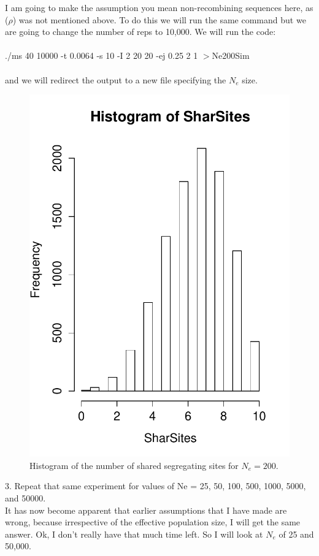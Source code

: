\documentclass[11pt, oneside]{article}
\begin{document}
I am going to make the assumption you mean non-recombining sequences here, as ($\rho$) was not mentioned above. To 
do this we will run the same command but we are going to change the number of reps to 10,000. We will run the code:\\
\noindent\\
./ms 40 10000 -t 0.0064 -s 10 -I 2 20 20 -ej 0.25 2 1 $>$Ne200Sim\\
\noindent\\
and we will redirect the output to a new file specifying the $N_e$ size. 

\begin{figure}
\centering
     \includegraphics[width=.5\textwidth]{Figures/Ne200Hist.pdf}
    \caption{Histogram of the number of shared segregating sites for $N_e = 200$. }\label{fig:SegSites}
\end{figure}


3. Repeat that same experiment for values of Ne = 25, 50, 100, 500, 1000, 5000, and 50000.\\
It has now become apparent that earlier assumptions that I have made are wrong, because 
irrespective of the effective population size, I will get the same answer. 
Ok, I don't really have that much time left. So I will look at $N_e$ of 25 and 50,000. 
\end{document}
